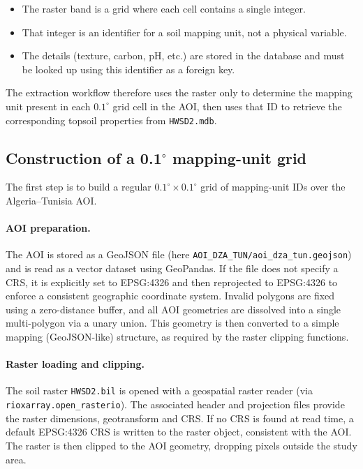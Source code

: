 \begin{itemize}
    \item The raster band is a grid where each cell contains a single integer.
    \item That integer is an identifier for a soil mapping unit, not a physical
    variable.
    \item The details (texture, carbon, pH, etc.) are stored in the database
    and must be looked up using this identifier as a foreign key.
\end{itemize}

The extraction workflow therefore uses the raster only to determine the mapping
unit present in each $0.1^{\circ}$ grid cell in the AOI, then uses that ID to
retrieve the corresponding topsoil properties from \texttt{HWSD2.mdb}.

\subsection{Construction of a 0.1\texorpdfstring{$^{\circ}$}{°} mapping-unit grid}

The first step is to build a regular $0.1^{\circ} \times 0.1^{\circ}$ grid of
mapping-unit IDs over the Algeria--Tunisia AOI.

\paragraph{AOI preparation.}

The AOI is stored as a GeoJSON file (here
\texttt{AOI\_DZA\_TUN/aoi\_dza\_tun.geojson}) and is read as a vector dataset
using GeoPandas. If the file does not specify a CRS, it is explicitly set to
EPSG:4326 and then reprojected to EPSG:4326 to enforce a consistent geographic
coordinate system. Invalid polygons are fixed using a zero-distance buffer, and
all AOI geometries are dissolved into a single multi-polygon via a unary union.
This geometry is then converted to a simple mapping (GeoJSON-like) structure,
as required by the raster clipping functions.

\paragraph{Raster loading and clipping.}

The soil raster \texttt{HWSD2.bil} is opened with a geospatial raster reader
(via \texttt{rioxarray.open\_rasterio}). The associated header and projection
files provide the raster dimensions, geotransform and CRS. If no CRS is found at
read time, a default EPSG:4326 CRS is written to the raster object, consistent
with the AOI. The raster is then clipped to the AOI geometry, dropping pixels
outside the study area.

